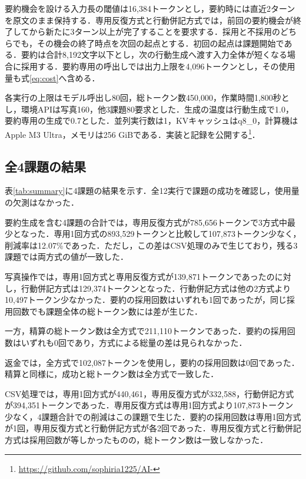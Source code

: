 \documentclass[letter]{ieicej}
\begin{document}
要約機会を設ける入力長の閾値は16,384トークンとし，要約時には直近2ターンを原文のまま保持する．専用反復方式と行動併記方式では，前回の要約機会が終了してから新たに3ターン以上が完了することを要求する．採用と不採用のどちらでも，その機会の終了時点を次回の起点とする．初回の起点は課題開始である．要約は合計8,192文字以下とし，次の行動生成へ渡す入力全体が短くなる場合に採用する．要約専用の呼出しでは出力上限を4,096トークンとし，その使用量も式\eqref{eq:cost}へ含める．

各実行の上限はモデル呼出し80回，総トークン数450,000，作業時間1,800秒とし，環境APIは写真160，他3課題80要求とした．生成の温度は行動生成で1.0，要約専用の生成で0.7とした．並列実行数は1，KVキャッシュはq8\_0，計算機はApple M3 Ultra，メモリは256 GiBである．実装と記録を公開する\footnote{\url{https://github.com/sophiria1225/AI-}}．

\subsection{全4課題の結果}

表\ref{tab:summary}に4課題の結果を示す．全12実行で課題の成功を確認し，使用量の欠測はなかった．

\SummaryResultsTable

要約生成を含む4課題の合計では，専用反復方式が785,656トークンで3方式中最少となった．専用1回方式の893,529トークンと比較して107,873トークン少なく，削減率は12.07\%であった．ただし，この差はCSV処理のみで生じており，残る3課題では両方式の値が一致した．

写真操作では，専用1回方式と専用反復方式が139,871トークンであったのに対し，行動併記方式は129,374トークンとなった．行動併記方式は他の2方式より10,497トークン少なかった．要約の採用回数はいずれも1回であったが，同じ採用回数でも課題全体の総トークン数には差が生じた．

一方，精算の総トークン数は全方式で211,110トークンであった．要約の採用回数はいずれも0回であり，方式による総量の差は見られなかった．

返金では，全方式で102,087トークンを使用し，要約の採用回数は0回であった．精算と同様に，成功と総トークン数は全方式で一致した．

CSV処理では，専用1回方式が440,461，専用反復方式が332,588，行動併記方式が394,351トークンであった．専用反復方式は専用1回方式より107,873トークン少なく，4課題合計での削減はこの課題で生じた．要約の採用回数は専用1回方式が1回，専用反復方式と行動併記方式が各2回であった．専用反復方式と行動併記方式は採用回数が等しかったものの，総トークン数は一致しなかった．
\end{document}
